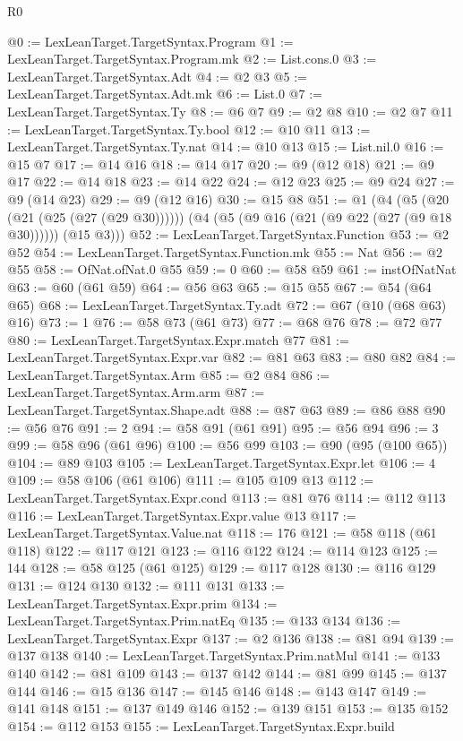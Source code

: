 \begin{lexlean}{R0}
\begin{coremodule}
@0 := LexLeanTarget.TargetSyntax.Program
@1 := LexLeanTarget.TargetSyntax.Program.mk
@2 := List.cons.{0}
@3 := LexLeanTarget.TargetSyntax.Adt
@4 := @2 @3
@5 := LexLeanTarget.TargetSyntax.Adt.mk
@6 := List.{0}
@7 := LexLeanTarget.TargetSyntax.Ty
@8 := @6 @7
@9 := @2 @8
@10 := @2 @7
@11 := LexLeanTarget.TargetSyntax.Ty.bool
@12 := @10 @11
@13 := LexLeanTarget.TargetSyntax.Ty.nat
@14 := @10 @13
@15 := List.nil.{0}
@16 := @15 @7
@17 := @14 @16
@18 := @14 @17
@20 := @9 (@12 @18)
@21 := @9 @17
@22 := @14 @18
@23 := @14 @22
@24 := @12 @23
@25 := @9 @24
@27 := @9 (@14 @23)
@29 := @9 (@12 @16)
@30 := @15 @8
@51 := @1
    (@4
      (@5 (@20 (@21 (@25 (@27 (@29 @30))))))
      (@4 (@5 (@9 @16 (@21 (@9 @22 (@27 (@9 @18 @30)))))) (@15 @3)))
@52 := LexLeanTarget.TargetSyntax.Function
@53 := @2 @52
@54 := LexLeanTarget.TargetSyntax.Function.mk
@55 := Nat
@56 := @2 @55
@58 := OfNat.ofNat.{0} @55
@59 := 0
@60 := @58 @59
@61 := instOfNatNat
@63 := @60 (@61 @59)
@64 := @56 @63
@65 := @15 @55
@67 := @54 (@64 @65)
@68 := LexLeanTarget.TargetSyntax.Ty.adt
@72 := @67 (@10 (@68 @63) @16)
@73 := 1
@76 := @58 @73 (@61 @73)
@77 := @68 @76
@78 := @72 @77
@80 := LexLeanTarget.TargetSyntax.Expr.match @77
@81 := LexLeanTarget.TargetSyntax.Expr.var
@82 := @81 @63
@83 := @80 @82
@84 := LexLeanTarget.TargetSyntax.Arm
@85 := @2 @84
@86 := LexLeanTarget.TargetSyntax.Arm.arm
@87 := LexLeanTarget.TargetSyntax.Shape.adt
@88 := @87 @63
@89 := @86 @88
@90 := @56 @76
@91 := 2
@94 := @58 @91 (@61 @91)
@95 := @56 @94
@96 := 3
@99 := @58 @96 (@61 @96)
@100 := @56 @99
@103 := @90 (@95 (@100 @65))
@104 := @89 @103
@105 := LexLeanTarget.TargetSyntax.Expr.let
@106 := 4
@109 := @58 @106 (@61 @106)
@111 := @105 @109 @13
@112 := LexLeanTarget.TargetSyntax.Expr.cond
@113 := @81 @76
@114 := @112 @113
@116 := LexLeanTarget.TargetSyntax.Expr.value @13
@117 := LexLeanTarget.TargetSyntax.Value.nat
@118 := 176
@121 := @58 @118 (@61 @118)
@122 := @117 @121
@123 := @116 @122
@124 := @114 @123
@125 := 144
@128 := @58 @125 (@61 @125)
@129 := @117 @128
@130 := @116 @129
@131 := @124 @130
@132 := @111 @131
@133 := LexLeanTarget.TargetSyntax.Expr.prim
@134 := LexLeanTarget.TargetSyntax.Prim.natEq
@135 := @133 @134
@136 := LexLeanTarget.TargetSyntax.Expr
@137 := @2 @136
@138 := @81 @94
@139 := @137 @138
@140 := LexLeanTarget.TargetSyntax.Prim.natMul
@141 := @133 @140
@142 := @81 @109
@143 := @137 @142
@144 := @81 @99
@145 := @137 @144
@146 := @15 @136
@147 := @145 @146
@148 := @143 @147
@149 := @141 @148
@151 := @137 @149 @146
@152 := @139 @151
@153 := @135 @152
@154 := @112 @153
@155 := LexLeanTarget.TargetSyntax.Expr.build

\end{coremodule}
\end{lexlean}
